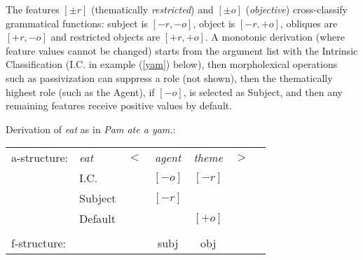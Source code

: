 \begin{sloppypar}
\noindent  
The features $[\pm r]$ (thematically \textit{restricted}) and $[\pm o]$ (\textit{objective}) cross-classify grammatical functions: subject is $[-r, -o]$, object is $[-r, +o]$, obliques are $[+r, -o]$ and
restricted objects are $[+r, +o]$.   A monotonic derivation (where feature values cannot be changed) starts from the argument list with the Intrinsic Classification (I.C. in example  (\ref{yam}) below), then morpholexical operations such as passivization can suppress a role (not shown), then the thematically highest role (such as the Agent), if $[-o]$, is selected as Subject, %
and then any remaining features receive positive values by default.
\end{sloppypar}

 \begin{exe}
\ex\label{yam}{Derivation of \textit{eat} as in \textit{Pam ate a yam.}:\\
\begin{tabular}[t]{@{}lllccll}
a-structure: &{\it eat}& $<$& \textit{agent} & \textit{theme}   & $>$ & \\
             & I.C.      &    & $[-o]$ & $[-r]$   &   & \\
             &  Subject     &    & $[-r]$ &            &              & \\
             &  Default     &    &     & $[+o]$   &   & \\
             &       &    &\vline    & \vline &    & \\
f-structure: &       &    &{\sc subj} &{\sc obj}  &   &
\end{tabular}
  }
\end{exe}

